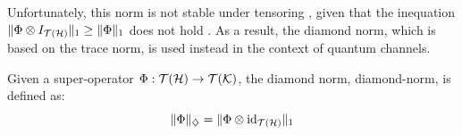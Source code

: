 

Unfortunately, this norm is not stable under tensoring , given that the inequation $ \lVert \Phi \otimes I_{\mathcal{T}(\mathcal{H})} \rVert_{1} \geq \lVert \Phi \rVert_{1}$ does not hold \cite{watrous2018theory}. As a result, the diamond norm, which is based on the trace norm, is used instead in the context of quantum channels. 

\begin{definition} \label{def:diamond_norm}
  Given a super-operator $\Phi: \mathcal{T}(\mathcal{H}) \to \mathcal{T}(\mathcal{K})$, the diamond norm, \gls{diamond-norm}, is defined as:
  \begin{equation*}  \label{eq:diamond_distance}
    \lVert \Phi \rVert_{\diamondsuit} =  \lVert \Phi \otimes \mathrm{id}_{\mathcal{T}(\mathcal{H})} \rVert_{1}
  \end{equation*}
\end{definition}





